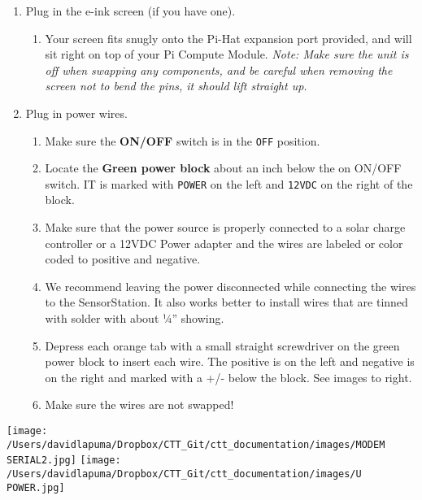 \documentclass[
]{article}
\providecommand{\tightlist}{%
  \setlength{\itemsep}{0pt}\setlength{\parskip}{0pt}}
\begin{document}
\begin{enumerate}
\def\labelenumi{\arabic{enumi}.}
\tightlist
\item
  Plug in the e-ink screen (if you have one).

  \begin{enumerate}
  \def\labelenumii{\alph{enumii}.}
  \tightlist
  \item
    Your screen fits snugly onto the Pi-Hat expansion port provided, and
    will sit right on top of your Pi Compute Module. \emph{Note: Make
    sure the unit is off when swapping any components, and be careful
    when removing the screen not to bend the pins, it should lift
    straight up.}
  \end{enumerate}
\item
  Plug in power wires.

  \begin{enumerate}
  \def\labelenumii{\alph{enumii}.}
  \tightlist
  \item
    Make sure the \textbf{ON/OFF} switch is in the \texttt{OFF}
    position.
  \item
    Locate the \textbf{Green power block} about an inch below the on
    ON/OFF switch. IT is marked with \texttt{POWER} on the left and
    \texttt{12VDC} on the right of the block.
  \item
    Make sure that the power source is properly connected to a solar
    charge controller or a 12VDC Power adapter and the wires are labeled
    or color coded to positive and negative.
  \item
    We recommend leaving the power disconnected while connecting the
    wires to the SensorStation. It also works better to install wires
    that are tinned with solder with about ¼'' showing.
  \item
    Depress each orange tab with a small straight screwdriver on the
    green power block to insert each wire. The positive is on the left
    and negative is on the right and marked with a +/- below the block.
    See images to right.
  \item
    Make sure the wires are not swapped!
  \end{enumerate}
\end{enumerate}

\texttt{[image: /Users/davidlapuma/Dropbox/CTT\_Git/ctt\_documentation/images/MODEM SERIAL2.jpg]}
\texttt{[image: /Users/davidlapuma/Dropbox/CTT\_Git/ctt\_documentation/images/U POWER.jpg]}
\end{document}
